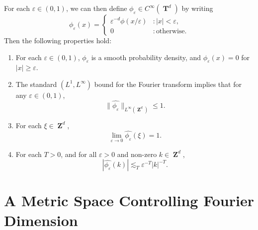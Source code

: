 \documentclass[12pt,reqno]{article}
\numberwithin{equation}{section}
\DeclareMathOperator{\ZZ}{\mathbf{Z}}
\DeclareMathOperator{\TT}{\mathbf{T}}
\begin{document}
For each $\varepsilon \in (0,1)$, we can then define $\phi_\varepsilon \in C^\infty(\TT^d)$ by writing
%
\[ \phi_\varepsilon(x) = \begin{cases} \varepsilon^{-d} \phi(x/\varepsilon) &: |x| < \varepsilon, \\ 0 &: \text{otherwise}. \end{cases} \]
%
Then the following properties hold:
%
\begin{enumerate}
    \item For each $\varepsilon \in (0,1)$, $\phi_\varepsilon$ is a smooth probability density, and $\phi_\varepsilon(x) = 0$ for $|x| \geq \varepsilon$.

    \item The standard $(L^1,L^\infty)$ bound for the Fourier transform implies that for any $\varepsilon \in (0,1)$,
    \begin{equation} \label{equationDIOJAOIJVIV23242}
        \| \widehat{\phi_\varepsilon} \|_{L^\infty(\ZZ^d)} \leq 1.
    \end{equation}


    \item For each $\xi \in \ZZ^d$,
    \begin{equation} \label{approximationtoidentitypointwiseconvergence}
        \lim_{\varepsilon \to 0} \widehat{\phi_\varepsilon}(\xi) = 1.
    \end{equation}
        
    \item For each $T > 0$, and for all $\varepsilon > 0$ and non-zero $k \in \ZZ^d$,
    \begin{equation} \label{molificationdecaybound}
        |\widehat{\phi_\varepsilon}(k)| \lesssim_T \varepsilon^{-T} |k|^{-T}.
    \end{equation}
\end{enumerate}

\section{A Metric Space Controlling Fourier Dimension}
\end{document}
